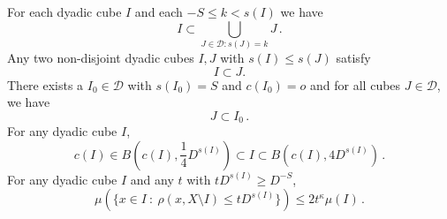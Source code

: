 For each dyadic cube $I$ and each $-S\le k<s(I)$ we have
\begin{equation}\label{coverdyadic}
    I\subset \bigcup_{J\in \mathcal {D}: s(J)=k}J\, .
\end{equation}
Any two non-disjoint dyadic cubes $I,J$ with $s(I)\le s(J)$ satisfy
\begin{equation}\label{dyadicproperty}
    I\subset J.
\end{equation}
There exists a $I_0 \in \mathcal{D}$ with $s(I_0) = S$ and $c(I_0) = o$
and for all cubes $J \in \mathcal{D}$, we have
\begin{equation}\label{subsetmaxcube}
    J \subset I_0\,.
\end{equation}
For any dyadic cube $I$,
\begin{equation}
    \label{eq-vol-sp-cube}
    c(I)\in B(c(I), \frac{1}{4} D^{s(I)}) \subset I \subset B(c(I), 4 D^{s(I)})\,.
\end{equation}
For any dyadic cube $I$ and any $t$ with $tD^{s(I)} \ge D^{-S}$,
\begin{equation}
    \label{eq-small-boundary}
    \mu(\{x \in I \ : \ \rho(x, X \setminus I) \leq t D^{s(I)}\}) \le 2 t^\kappa \mu(I)\,.
\end{equation}



